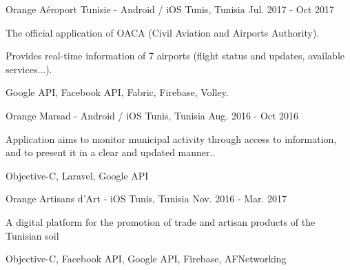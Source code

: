 

\begin{cventries}

  \cventrydetailed
    {Orange} %
    {Aéroport Tunisie - Android / iOS} %
    {Tunis, Tunisia} %
    {Jul. 2017 - Oct 2017} %
    {
      \begin{cvitems} %
        \item {The official application of OACA (Civil Aviation and Airports Authority).}
        \item {Provides real-time information of 7 airports (flight status and updates, available services...).}
      \end{cvitems}
    }
    {Google API, Facebook API, Fabric, Firebase, Volley.} %
    
  \cventrydetailed
    {Orange} %
	{Marsad - Android / iOS} %
	{Tunis, Tunisia} %
	{Aug. 2016 - Oct 2016} %
	{
		\begin{cvitems} %
			\item {Application aims to monitor municipal activity through access to information, and to present it in a clear and updated manner..}
		\end{cvitems}
	}
	{Objective-C, Laravel, Google API} %

  \cventrydetailed
    {Orange} %
    {Artisans d'Art - iOS} %
    {Tunis, Tunisia} %
    {Nov. 2016 - Mar. 2017} %
    {
      \begin{cvitems} %
        \item {A digital platform for the promotion of trade and artisan products of the Tunisian soil}
      \end{cvitems}
    }
    {Objective-C, Facebook API, Google API, Firebase, AFNetworking} %
    

\end{cventries}
